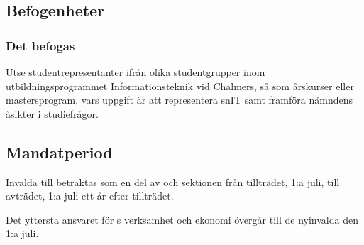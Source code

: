 \subsection{Befogenheter}

\subsubsection{Det befogas \SNIT}
\begin{att}
	\item Utse studentrepresentanter ifrån olika studentgrupper inom utbildningsprogrammet Informationsteknik vid Chalmers, så som årskurser eller mastersprogram, vars uppgift är att representera snIT samt framföra nämndens åsikter i studiefrågor.
\end{att}

\subsection{Mandatperiod}
Invalda till \SNIT{} betraktas som en del av \SNIT{} och sektionen från tillträdet, 1:a juli, till avträdet, 1:a juli ett år efter tillträdet.

Det yttersta ansvaret för \SNIT{}s verksamhet och ekonomi övergår till de nyinvalda den 1:a juli.
